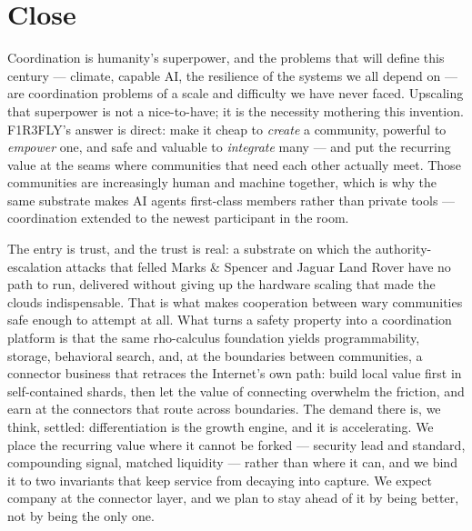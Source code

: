 \documentclass[11pt]{article}
\begin{document}
\section{Close}\label{sec:close}

Coordination is humanity's superpower, and the problems that will define this century --- climate, capable AI, the resilience of the systems we all depend on --- are coordination problems of a scale and difficulty we have never faced. Upscaling that superpower is not a nice-to-have; it is the necessity mothering this invention. F1R3FLY's answer is direct: make it cheap to \emph{create} a community, powerful to \emph{empower} one, and safe and valuable to \emph{integrate} many --- and put the recurring value at the seams where communities that need each other actually meet. Those communities are increasingly human and machine together, which is why the same substrate makes AI agents first-class members rather than private tools --- coordination extended to the newest participant in the room.

The entry is trust, and the trust is real: a substrate on which the authority-escalation attacks that felled Marks \& Spencer and Jaguar Land Rover have no path to run, delivered without giving up the hardware scaling that made the clouds indispensable. That is what makes cooperation between wary communities safe enough to attempt at all. What turns a safety property into a coordination platform is that the same rho-calculus foundation yields programmability, storage, behavioral search, and, at the boundaries between communities, a connector business that retraces the Internet's own path: build local value first in self-contained shards, then let the value of connecting overwhelm the friction, and earn at the connectors that route across boundaries. The demand there is, we think, settled: differentiation is the growth engine, and it is accelerating. We place the recurring value where it cannot be forked --- security lead and standard, compounding signal, matched liquidity --- rather than where it can, and we bind it to two invariants that keep service from decaying into capture. We expect company at the connector layer, and we plan to stay ahead of it by being better, not by being the only one.
\end{document}
